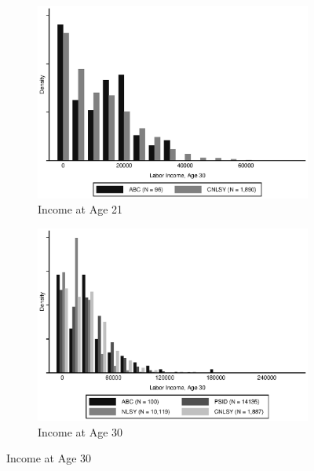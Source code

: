 \begin{figure}[H]
	\caption{Support of ABC and Auxiliary Data} \label{fig:support}
	\begin{subfigure}[h]{0.8\textwidth}
	\centering
	\caption{Income at Age 21} \label{fig:support_inc21}
	\includegraphics[width=\textwidth]{AppOutput/Methodology/support_inc21.eps}
	\end{subfigure}
	
	\begin{subfigure}[h]{0.8\textwidth}
	\centering
	\caption{Income at Age 30} \label{fig:support_inc30}
	\includegraphics[width=\textwidth]{AppOutput/Methodology/support_inc30.eps}
	\end{subfigure}
\end{figure}




